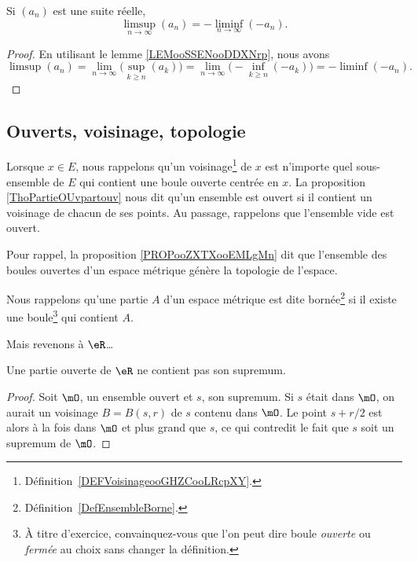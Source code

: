 \begin{lemma}       \label{LEMooMTRDooBMxFmn}
	Si \( (a_n)\) est une suite réelle,
	\begin{equation}
		\limsup_{n\to\infty}(a_n)=-\liminf_{n\to\infty}(-a_n).
	\end{equation}
\end{lemma}

\begin{proof}
	En utilisant le lemme \ref{LEMooSSENooDDXNrp}, nous avons
	\begin{equation}
		\limsup(a_n)=\lim_{n\to\infty}\Big( \sup_{k\geq n}(a_k) \Big)=\lim_{n\to \infty} \Big( -\inf_{k\geq n}(-a_k) \Big)=-\liminf(-a_n).
	\end{equation}
\end{proof}

\subsection{Ouverts, voisinage, topologie}

Lorsque \( x\in E\), nous rappelons qu'un voisinage\footnote{Définition~\ref{DEFVoisinageooGHZCooLRcpXY}.} de \( x\) est n'importe quel sous-ensemble de \( E\) qui contient une boule ouverte centrée en \( x\). La proposition \ref{ThoPartieOUvpartouv} nous dit qu'un ensemble est ouvert si il contient un voisinage de chacun de ses points. Au passage, rappelons que l'ensemble vide est ouvert.

Pour rappel, la proposition \ref{PROPooZXTXooEMLgMn} dit que l'ensemble des boules ouvertes d'un espace métrique génère la topologie de l'espace.

Nous rappelons qu'une partie \( A\) d'un espace métrique est dite bornée\footnote{Définition~\ref{DefEnsembleBorne}.} si il existe une boule\footnote{À titre d'exercice, convainquez-vous que l'on peut dire boule \emph{ouverte} ou \emph{fermée} au choix sans changer la définition.} qui contient \( A\).

Mais revenons à \( \eR \)\dots
\begin{lemma}  \label{LemSupOuvPas}
	Une partie ouverte de \( \eR\) ne contient pas son supremum.
\end{lemma}

\begin{proof}
	Soit \( \mO\), un ensemble ouvert et \( s\), son supremum. Si \( s\) était dans \( \mO\), on aurait un voisinage \( B=B(s,r)\) de \( s\) contenu dans \( \mO\). Le point \( s+r/2\) est alors à la fois dans \( \mO\) et plus grand que \( s\), ce qui contredit le fait que \( s\) soit un supremum de \( \mO\).
\end{proof}

